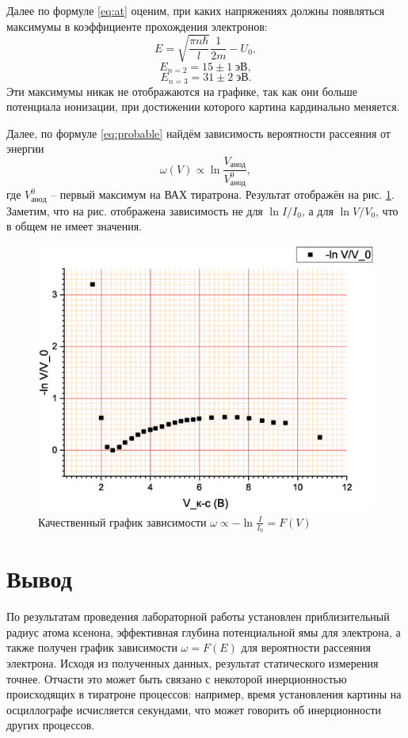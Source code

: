 \documentclass[a4paper]{article}
\begin{document}
Далее по формуле \eqref{eq:at} оценим, при каких напряжениях должны появляться максимумы в коэффициенте прохождения электронов:
\[
	E = \sqrt{\frac{\pi n \hbar}{l}} \frac{1}{2 m} - U_0,
\]
\[  E_{n=2}= 15 \pm 1 \; эВ,\]
\[  E_{n=3} = 31 \pm 2 \; эВ. \]
Эти максимумы никак не отображаются на графике, так как они больше потенциала ионизации, при достижении которого картина кардинально меняется.

Далее, по формуле \eqref{eq:probable} найдём зависимость вероятности рассеяния от энергии
\[\omega(V) \propto \ln \frac{V_{анод}}{V_{анод}^0},\] где $ V_{анод}^0 $ -- первый максимум на ВАХ тиратрона. Результат отображён на рис. \ref{fig:graph4}. Заметим, что на рис. отображена зависимость не для $ \ln I/I_0 $, а для $ \ln V/V_0 $, что в общем не имеет значения.

\begin{figure}
	\centering
	\includegraphics[width=1.0\linewidth]{Graph5}
	\caption{Качественный график зависимости $ \omega \propto -\ln \frac{I}{I_0} = F(V) $}
	\label{fig:graph4}
\end{figure}

\section{Вывод}

По результатам проведения лабораторной работы установлен приблизительный радиус атома ксенона, эффективная глубина потенциальной ямы для электрона, а также получен график зависимости $ \omega = F(E) $ для вероятности рассеяния электрона. Исходя из полученных данных, результат статического измерения точнее. Отчасти это может быть связано с некоторой инерционностью происходящих в тиратроне процессов: например, время установления картины на осциллографе исчисляется секундами, что может говорить об инерционности других процессов.
\end{document}
